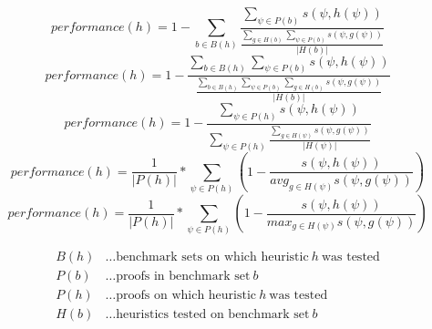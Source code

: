 \documentclass{llncs}
\begin{document}
\begin{equation} \label{eq:space}
	\mathit{performance}(h) = 1 - \sum_{b \in B(h)}{
		\frac{
			\sum_{\psi \in P(b)}{
				s(\psi,h(\psi))
			}
		}{
      \frac{
			  \sum_{g\in H(b)}{
				  \sum_{\psi \in P(b)}{
					  s(\psi,g(\psi))
				  }
			  }
      }{
        |H(b)|
      }
		}
	}
\end{equation}
\begin{equation} \label{eq:space}
  \mathit{performance}(h) = 1 -
    \frac{
      \sum_{b \in B(h)}{\sum_{\psi \in P(b)}{
        s(\psi,h(\psi))
      }}
    }{
      \frac{
        \sum_{b \in B(h)}{\sum_{\psi \in P(b)}{
          \sum_{g\in H(b)}{
            s(\psi,g(\psi))
          }
        }}
      }{
        |H(b)|
      }
    }
\end{equation}
\begin{equation} \label{eq:space}
  \mathit{performance}(h) = 1 -
    \frac{
      \sum_{\psi \in P(h)}{
        s(\psi,h(\psi))
      }
    }{
      \sum_{\psi \in P(h)}{
        \frac{
          \sum_{g\in H(\psi)}{s(\psi,g(\psi))}
        }{
          |H(\psi)|
        }
      }
    }
\end{equation}
\begin{equation} \label{eq:space}
  \mathit{performance}(h) = \frac{1}{|P(h)|} * \sum_{\psi \in P(h)}{\left( 1 -
    \frac{
      s(\psi,h(\psi))
    }{
        \mathit{avg}_{g\in H(\psi)}{s(\psi,g(\psi))}
    } \right)
  }
\end{equation}
\begin{equation} \label{eq:space}
  \mathit{performance}(h) = \frac{1}{|P(h)|} * \sum_{\psi \in P(h)}{\left( 1 -
    \frac{
      s(\psi,h(\psi))
    }{
        \mathit{max}_{g\in H(\psi)}{s(\psi,g(\psi))}
    } \right)
  }
\end{equation}


\begin{align*}
	B(h) &\ldots \text{benchmark sets on which heuristic} \ h \ \text{was tested}\\
	P(b) &\ldots \text{proofs in benchmark set} \ b\\
  P(h) &\ldots \text{proofs on which heuristic} \ h \ \text{was tested}\\
	H(b) &\ldots \text{heuristics tested on benchmark set} \ b
\end{align*}
\end{document}
